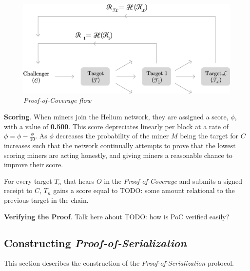 \documentclass[letterpaper,11pt]{article}
\def\proofofcoverage/{\emph{Proof-of-Coverage}}
\newcommand{\todo}[1]{}
\renewcommand{\todo}[1]{{\color{red} TODO: {#1}}}
\begin{document}
\begin{figure}[H]
	\begin{center}
  		\includegraphics[width=\textwidth]{diagram4.eps}
  		\caption{\emph{\proofofcoverage/ flow}}
  		\label{fig:poc-flow}
 	\end{center}
\end{figure}

\textbf{Scoring}. \label{scores} When miners join the Helium network, they are assigned a score, $\mathit{\phi}$, with a value of \textbf{0.500}. This score depreciates linearly per block at a rate of $\mathit{\phi = \phi - \frac{\phi}{10}}$. As $\mathit{\phi}$ decreases the probability of the miner $\mathit{M}$ being the target for $\mathit{C}$ increases such that the network continually attempts to prove that the lowest scoring miners are acting honestly, and giving miners a reasonable chance to improve their score.\newline

For every target $\mathit{T_n}$ that hears $\mathit{O}$ in the \proofofcoverage/ and submits a signed receipt to $\mathit{C}$, $\mathit{T_n}$ gains a score equal to \todo{some amount relational to the previous target in the chain}.\newline

\textbf{Verifying the Proof}. Talk here about \todo{how is PoC verified easily?}

\subsection{Constructing \emph{Proof-of-Serialization}}

This section describes the construction of the \emph{Proof-of-Serialization} protocol.\newline
\end{document}

